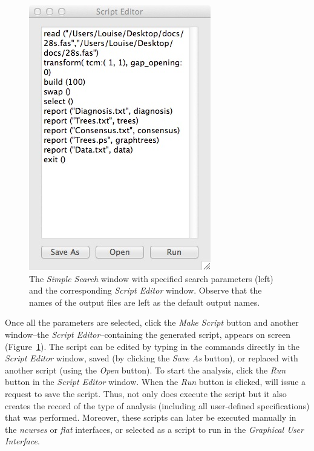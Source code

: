 \begin{figure}
\begin{minipage}[c]{0.52\textwidth}
\includegraphics[width=\textwidth]{doc/figures/simplesearch_script.jpg}
\end{minipage}

\caption{The \emph{Simple Search} window with specified search parameters (left) and the corresponding 
\emph{Script Editor} window. Observe that the names of the output files are left as the default output names.}
\label{fig:ScriptEditor_Window}
\end{figure}

Once all the parameters are selected, click the \emph{Make Script} button and another
window--the \emph{Script Editor}--containing the generated script, appears on screen (Figure~\ref{fig:ScriptEditor_Window}). 
The script can be edited by typing in the commands directly in the \emph{Script Editor} window,
saved (by clicking the \emph{Save As} button), or replaced with another script (using 
the \emph{Open} button). To start the analysis, click the \emph{Run} button in the 
\emph{Script Editor} window. When the \emph{Run} button is clicked, \poy will issue a
request to save the script. Thus, not only does \poy execute the script but
it also creates the record of the type of analysis (including all user-defined specifications) that was performed.
Moreover, these scripts can later be executed manually in the \emph{ncurses} or \emph{flat} interfaces, or
selected as a script to run in the \emph{Graphical User Interface}.

